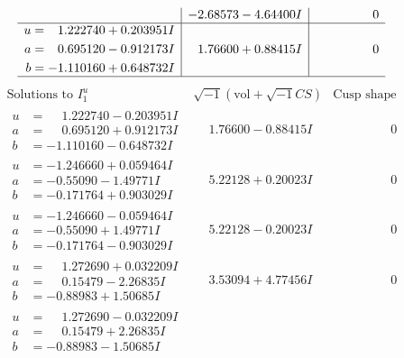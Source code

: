\documentclass[1p]{elsarticle_modified}
\theoremstyle{definition}
\newcommand{\I}{\sqrt{-1}}
\begin{document}
$$\begin{array}{c|c|c}
 & -2.68573 - 4.64400 I & \phantom{-0.000000 } 0 \\ \hline\begin{aligned}
u &= \phantom{-}1.222740 + 0.203951 I \\
a &= \phantom{-}0.695120 - 0.912173 I \\
b &= -1.110160 + 0.648732 I\end{aligned}
 & \phantom{-}1.76600 + 0.88415 I & \phantom{-0.000000 } 0\\
 \hline 
 \end{array}$$\newpage$$\begin{array}{c|c|c}  
\text{Solutions to }I^u_{1}& \I (\text{vol} + \sqrt{-1}CS) & \text{Cusp shape}\\
 \hline 
\begin{aligned}
u &= \phantom{-}1.222740 - 0.203951 I \\
a &= \phantom{-}0.695120 + 0.912173 I \\
b &= -1.110160 - 0.648732 I\end{aligned}
 & \phantom{-}1.76600 - 0.88415 I & \phantom{-0.000000 } 0 \\ \hline\begin{aligned}
u &= -1.246660 + 0.059464 I \\
a &= -0.55090 - 1.49771 I \\
b &= -0.171764 + 0.903029 I\end{aligned}
 & \phantom{-}5.22128 + 0.20023 I & \phantom{-0.000000 } 0 \\ \hline\begin{aligned}
u &= -1.246660 - 0.059464 I \\
a &= -0.55090 + 1.49771 I \\
b &= -0.171764 - 0.903029 I\end{aligned}
 & \phantom{-}5.22128 - 0.20023 I & \phantom{-0.000000 } 0 \\ \hline\begin{aligned}
u &= \phantom{-}1.272690 + 0.032209 I \\
a &= \phantom{-}0.15479 - 2.26835 I \\
b &= -0.88983 + 1.50685 I\end{aligned}
 & \phantom{-}3.53094 + 4.77456 I & \phantom{-0.000000 } 0 \\ \hline\begin{aligned}
u &= \phantom{-}1.272690 - 0.032209 I \\
a &= \phantom{-}0.15479 + 2.26835 I \\
b &= -0.88983 - 1.50685 I\end{aligned}

\end{array}$$
\end{document}
